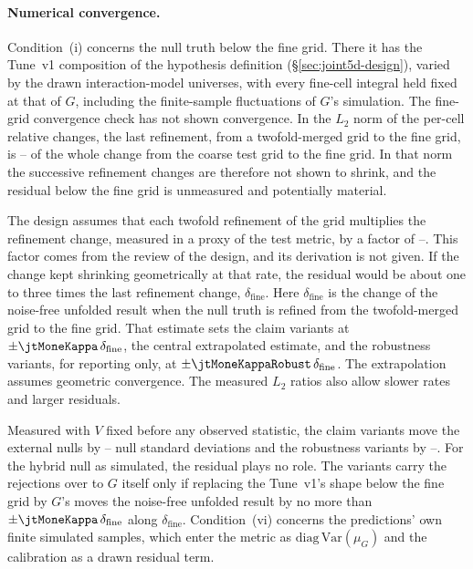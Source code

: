 \paragraph{Numerical convergence.} Condition~(i) concerns the null truth below the fine grid. There it has the Tune~v1 composition of the hypothesis definition (\S\ref{sec:joint5d-design}), varied by the drawn interaction-model universes, with every fine-cell integral held fixed at that of $G$, including the finite-sample fluctuations of $G$'s simulation. The fine-grid convergence check has not shown convergence. In the $L_{2}$ norm of the per-cell relative changes, the last refinement, from a twofold-merged grid to the fine grid, is \jtMoneMin--\jtMoneMax{} of the whole change from the coarse test grid to the fine grid. In that norm the successive refinement changes are therefore not shown to shrink, and the residual below the fine grid is unmeasured and potentially material.

The design assumes that each twofold refinement of the grid multiplies the refinement change, measured in a proxy of the test metric, by a factor of \jtMoneWnormMin--\jtMoneWnormMax{}. This factor comes from the review of the design, and its derivation is not given. If the change kept shrinking geometrically at that rate, the residual would be about one to three times the last refinement change, $\delta_{\mathrm{fine}}$. Here $\delta_{\mathrm{fine}}$ is the change of the noise-free unfolded result when the null truth is refined from the twofold-merged grid to the fine grid. That estimate sets the claim variants at $\pm\jtMoneKappa\,\delta_{\mathrm{fine}}$, the central extrapolated estimate, and the robustness variants, for reporting only, at $\pm\jtMoneKappaRobust\,\delta_{\mathrm{fine}}$. The extrapolation assumes geometric convergence. The measured $L_{2}$ ratios also allow slower rates and larger residuals.

Measured with $V$ fixed before any observed statistic, the claim variants move the external nulls by \jtMoneClaimSdMin--\jtMoneClaimSdMax{} null standard deviations and the robustness variants by \jtMoneRobSdMin--\jtMoneRobSdMax{}. For the hybrid null as simulated, the residual plays no role. The variants carry the rejections over to $G$ itself only if replacing the Tune~v1's shape below the fine grid by $G$'s moves the noise-free unfolded result by no more than $\pm\jtMoneKappa\,\delta_{\mathrm{fine}}$ along $\delta_{\mathrm{fine}}$. Condition~(vi) concerns the predictions' own finite simulated samples, which enter the metric as $\mathrm{diag}\,\mathrm{Var}(\mu_{G})$ and the calibration as a drawn residual term.

